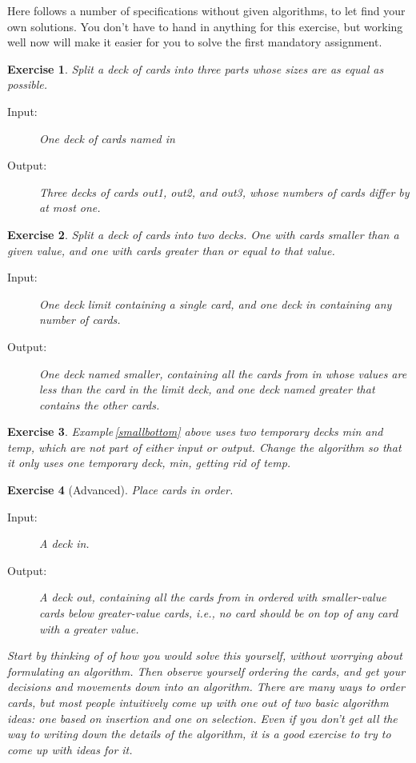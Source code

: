 \documentclass[a4paper,twoside]{tufte-handout}
\newtheorem{exercise}{Exercise}
\begin{document}
Here follows a number of specifications without given algorithms, to let
find your own solutions. You don't have to hand in anything for this
exercise, but working well now will make it easier for you to solve
the first mandatory assignment.

\begin{exercise}
  Split a deck of cards into three parts whose sizes are as equal as possible.
  \begin{description}
  \item[Input:] One deck of cards named \emph{in}
  \item[Output:] Three decks of cards \emph{out1}, \emph{out2}, and
    \emph{out3}, whose numbers of cards differ by at most one.
 \end{description}
\end{exercise}

\begin{exercise}
  Split a deck of cards into two decks. One with cards smaller than a
  given value, and one with cards greater than or equal to that value.
  \begin{description}
  \item[Input:] One deck \emph{limit} containing a single card, and one
    deck \emph{in} containing any number of cards.
  \item[Output:] One deck named \emph{smaller}, containing all the
    cards from \emph{in} whose values are less than the card in the
    \emph{limit} deck, and one deck named \emph{greater} that contains
    the other cards.
  \end{description}
\end{exercise}

\begin{exercise}
  Example\,\ref{smallbottom} above uses two temporary decks \emph{min}
  and \emph{temp}, which are not part of either input or
  output. Change the algorithm so that it only uses one temporary
  deck, \emph{min}, getting rid of \emph{temp}.
\end{exercise}

\begin{exercise}[Advanced]
  Place cards in order.
  \begin{description}
  \item[Input:] A deck \emph{in}.
  \item[Output:] A deck \emph{out}, containing all the cards from
    \emph{in} ordered with smaller-value cards below greater-value
    cards, i.e., no card should be on top of any card with a greater
    value.
 \end{description}
    
 Start by thinking of of how you would solve this yourself, without
 worrying about formulating an algorithm. Then observe yourself
 ordering the cards, and get your decisions and movements down into an
 algorithm. There are many ways to order cards, but most people
 intuitively come up with one out of two basic algorithm ideas: one
 based on \emph{insertion} and one on \emph{selection}. Even if you
 don't get all the way to writing down the details of the algorithm,
 it is a good exercise to try to come up with ideas for it.
\end{exercise}
\end{document}

